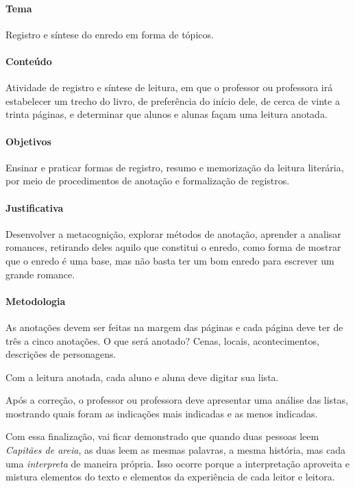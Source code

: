 \documentclass[12pt]{extarticle}
\begin{document}

\paragraph{Tema} Registro e síntese do enredo em forma de tópicos.

\paragraph{Conteúdo} Atividade de registro e síntese de leitura, em que
o professor ou professora irá estabelecer um trecho do
livro, de preferência do início dele, de cerca de vinte a trinta
páginas, e determinar que alunos e alunas façam uma leitura anotada.


\paragraph{Objetivos}
Ensinar e praticar formas de registro, resumo e memorização da leitura
literária, por meio de procedimentos de anotação e formalização de
registros.

\paragraph{Justificativa}
Desenvolver a metacognição, explorar métodos de anotação, aprender a
analisar romances, retirando deles aquilo que constitui o enredo, como
forma de mostrar que o enredo é uma base, mas não basta ter um bom
enredo para escrever um grande romance.

\paragraph{Metodologia}
As anotações devem ser feitas na margem das páginas e cada página deve
ter de três a cinco anotações. O que será anotado? Cenas, locais,
acontecimentos, descrições de personagens.

Com a leitura anotada, cada aluno e aluna deve digitar sua lista.

Após a correção, o professor ou professora deve apresentar uma análise
das listas, mostrando quais foram as indicações mais indicadas e as
menos indicadas.

Com essa finalização, vai ficar demonstrado que quando duas pessoas leem
\emph{Capitães de areia}, as duas leem as mesmas palavras, a mesma
história, mas cada uma \emph{interpreta} de maneira própria. Isso ocorre
porque a interpretação aproveita e mistura elementos do texto e
elementos da experiência de cada leitor e leitora.
\end{document}
